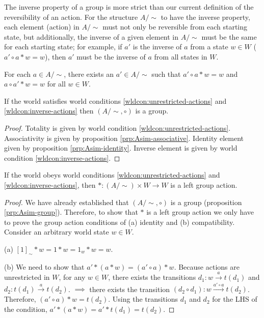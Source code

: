 	The inverse property of a group is more strict than our current definition of the reversibility of an action.
	For the structure $A/\sim$ to have the inverse property, each element (action) in $A/\sim$ must not only be reversible from each starting state, but additionally, the inverse of a given element in $A/\sim$ must be the same for each starting state; for example, if $a'$ is the inverse of $a$ from a state $w \in W$ ($a' \circ a * w = w$), then $a'$ must be the inverse of $a$ from all states in $W$.

	\begin{world_condition}\label{wldcon:inverse-actions}
		For each $a \in A/\sim$, there exists an $a' \in A/\sim$ such that $a' \circ a * w = w$ and $a \circ a' * w = w$ for all $w \in W$.
	\end{world_condition}


	\begin{proposition}\label{prp:Asim-group}
		If the world satisfies world conditions \ref{wldcon:unrestricted-actions} and \ref{wldcon:inverse-actions} then $(A/\sim, \circ)$ is a group.
	\end{proposition}
	\begin{proof}
		Totality is given by world condition \ref{wldcon:unrestricted-actions}.
		Associativity is given by proposition \ref{prp:Asim-associative}.
		Identity element given by proposition \ref{prp:Asim-identity}.
		Inverse element is given by world condition \ref{wldcon:inverse-actions}.
	\end{proof}

	\begin{proposition}\label{prp:world-conditions-sufficient}
		If the world obeys world conditions \ref{wldcon:unrestricted-actions} and \ref{wldcon:inverse-actions}, then $*: (A/\sim) \times W \to W$ is a left group action.
	\end{proposition}
	\begin{proof}
		We have already established that $(A/\sim, \circ)$ is a group (proposition \ref{prp:Asim-group}).
		Therefore, to show that $*$ is a left group action we only have to prove the group action conditions of (a) identity and (b) compatibility.
		Consider an arbitrary world state $w \in W$.

		(a) $[1]_{\sim} * w = 1 * w = 1_{w} * w = w$.

		(b) We need to show that $a' * (a * w) = (a' \circ a) * w$.
		Because actions are unrestricted in $W$, for any $w \in W$, there exists the transitions $d_{1}: w \xrightarrow{a} t(d_{1})$ and $d_{2}: t(d_{1}) \xrightarrow{a} t(d_{2})$.
		$\implies$ there exists the transition $(d_{2} \circ d_{1}): w \xrightarrow{a' \circ a} t(d_{2})$.
		Therefore, $(a' \circ a) * w = t(d_{2})$.
		Using the transitions $d_{1}$ and $ d_{2}$ for the LHS of the condition, $a' * ( a * w) = a' * t(d_{1}) = t(d_{2})$.
	\end{proof}

